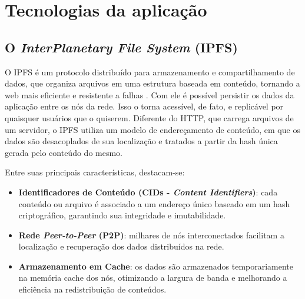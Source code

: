 \section{Tecnologias da aplicação}

\subsection{O \textit{InterPlanetary File System} (IPFS)}
\label{sec:ipfs}
O IPFS é um protocolo distribuído para armazenamento e compartilhamento de dados, que organiza arquivos em uma estrutura baseada em conteúdo, tornando a web mais eficiente e resistente a falhas \cite{ipfs2025}. Com ele é possível persistir os dados da aplicação entre os nós da rede. Isso o torna acessível, de fato, e replicável por quaisquer usuários que o quiserem. Diferente do HTTP, que carrega arquivos de um servidor, o IPFS utiliza um modelo de endereçamento de conteúdo, em que os dados são desacoplados de sua localização e tratados a partir da hash única gerada pelo conteúdo do mesmo.

Entre suas principais características, destacam-se:

\begin{itemize}
    \item \textbf{Identificadores de Conteúdo (CIDs - \textit{Content Identifiers})}: cada conteúdo ou arquivo é associado a um endereço único baseado em um hash criptográfico, garantindo sua integridade e imutabilidade.
    
    \item \textbf{Rede \textit{Peer-to-Peer} (P2P)}: milhares de nós interconectados facilitam a localização e recuperação dos dados distribuídos na rede.
    
    \item \textbf{Armazenamento em Cache}: os dados são armazenados temporariamente na memória cache dos nós, otimizando a largura de banda e melhorando a eficiência na redistribuição de conteúdos.
\end{itemize}

